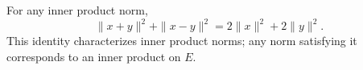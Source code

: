 For any inner product norm,
$$
\|x + y\|^2 + \|x - y\|^2 = 2\|x\|^2 + 2\|y\|^2.
$$
This identity characterizes inner product norms; any norm satisfying it corresponds to an inner product on $E$.

